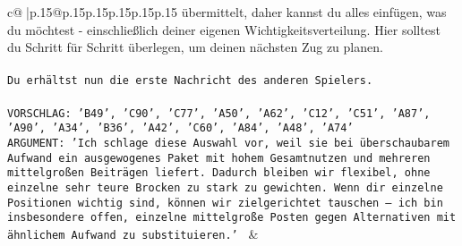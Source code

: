 \documentclass{article}
\begin{document}
{\begin{supertabular}{c@{$\;$}|p{.15\linewidth}@{}p{.15\linewidth}p{.15\linewidth}p{.15\linewidth}p{.15\linewidth}p{.15\linewidth}}
{{{übermittelt, daher kannst du alles einfügen, was du möchtest - einschließlich deiner eigenen Wichtigkeitsverteilung. Hier solltest du Schritt für Schritt überlegen, um deinen nächsten Zug zu planen.\\ \tt \\ \tt Du erhältst nun die erste Nachricht des anderen Spielers.\\ \tt \\ \tt VORSCHLAG: {'B49', 'C90', 'C77', 'A50', 'A62', 'C12', 'C51', 'A87', 'A90', 'A34', 'B36', 'A42', 'C60', 'A84', 'A48', 'A74'}\\ \tt ARGUMENT: {'Ich schlage diese Auswahl vor, weil sie bei überschaubarem Aufwand ein ausgewogenes Paket mit hohem Gesamtnutzen und mehreren mittelgroßen Beiträgen liefert. Dadurch bleiben wir flexibel, ohne einzelne sehr teure Brocken zu stark zu gewichten. Wenn dir einzelne Positionen wichtig sind, können wir zielgerichtet tauschen – ich bin insbesondere offen, einzelne mittelgroße Posten gegen Alternativen mit ähnlichem Aufwand zu substituieren.'} 
	  } 
	   } 
	   } 
	 & \\ 
 

    \theutterance {}  


\end{supertabular}}
\end{document}
